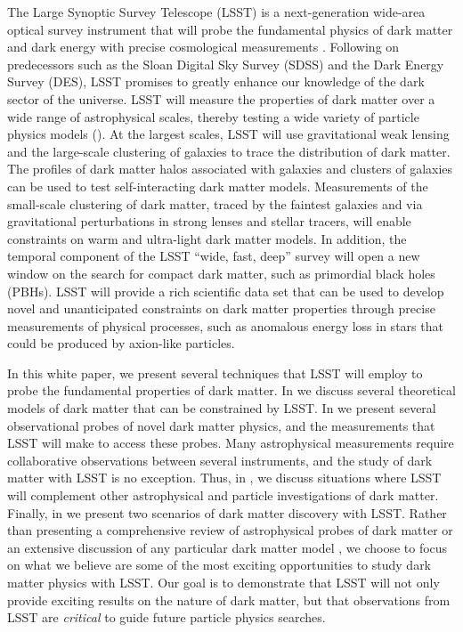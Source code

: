 The Large Synoptic Survey Telescope (LSST) is a next-generation wide-area optical survey instrument that will probe the fundamental physics of dark matter and dark energy with precise cosmological measurements \citep{0805.2366}. 
Following on predecessors such as the Sloan Digital Sky Survey (SDSS) and the Dark Energy Survey (DES), LSST promises to greatly enhance our knowledge of the dark sector of the universe. 
LSST will measure the properties of dark matter over a wide range of astrophysical scales, thereby testing a wide variety of particle physics models ().
At the largest scales, LSST will use gravitational weak lensing and the large-scale clustering of galaxies to trace the distribution of dark matter.
The profiles of dark matter halos associated with galaxies and clusters of galaxies can be used to test self-interacting dark matter models.
Measurements of the small-scale clustering of dark matter, traced by the faintest galaxies and via gravitational perturbations in strong lenses and stellar tracers, will enable constraints on warm and ultra-light dark matter models.
In addition, the temporal component of the LSST ``wide, fast, deep'' survey will open a new window on the search for compact dark matter, such as primordial black holes (PBHs).
LSST will provide a rich scientific data set that can be used to develop novel and unanticipated constraints on dark matter properties through precise measurements of physical processes, such as anomalous energy loss in stars that could be produced by axion-like particles.

In this white paper, we present several techniques that LSST will employ to probe the fundamental properties of dark matter. 
In  we discuss several theoretical models of dark matter that can be constrained by LSST.
In  we present several observational probes of novel dark matter physics, and the  measurements that LSST will make to access these probes.
Many astrophysical measurements require collaborative observations between several instruments, and the study of dark matter with LSST is no exception. 
Thus, in , we discuss situations where LSST will complement other astrophysical and particle investigations of dark matter.
Finally, in  we present two scenarios of dark matter discovery with LSST.
Rather than presenting a comprehensive review of astrophysical probes of dark matter  \citep[e.g.,][]{BuckleyPeter:2017} or an extensive discussion of any particular dark matter model \citep[e.g.,][]{Tulin:2017ara}, we choose to focus on what we believe are some of the most exciting opportunities to study dark matter physics with LSST. 
Our goal is to demonstrate that LSST will not only provide exciting results on the nature of dark matter, but that observations from LSST are {\it critical} to guide future particle physics searches.

